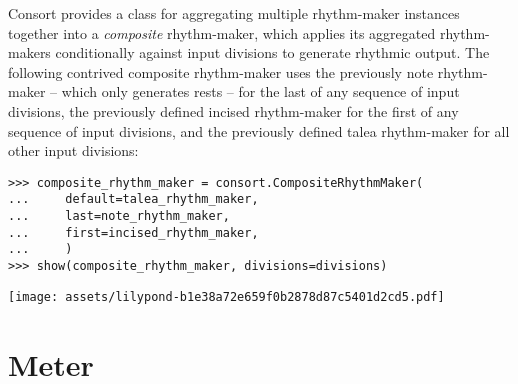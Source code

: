 Consort provides a class for aggregating multiple rhythm-maker instances
together into a \emph{composite} rhythm-maker, which applies its aggregated
rhythm-makers conditionally against input divisions to generate rhythmic
output. The following contrived composite rhythm-maker uses the previously note
rhythm-maker -- which only generates rests -- for the last of any sequence of
input divisions, the previously defined incised rhythm-maker for the first of
any sequence of input divisions, and the previously defined talea rhythm-maker
for all other input divisions:

\begin{comment}
<abjad>
composite_rhythm_maker = consort.CompositeRhythmMaker(
    default=talea_rhythm_maker,
    last=note_rhythm_maker,
    first=incised_rhythm_maker,
    )
show(composite_rhythm_maker, divisions=divisions)
</abjad>
\end{comment}

\begin{singlespacing}
\vspace{-0.5\baselineskip}
\begin{lstlisting}
>>> composite_rhythm_maker = consort.CompositeRhythmMaker(
...     default=talea_rhythm_maker,
...     last=note_rhythm_maker,
...     first=incised_rhythm_maker,
...     )
>>> show(composite_rhythm_maker, divisions=divisions)
\end{lstlisting}
\noindent\texttt{[image: assets/lilypond-b1e38a72e659f0b2878d87c5401d2cd5.pdf]}
\end{singlespacing}


\section{Meter}
\label{sec:meter}


